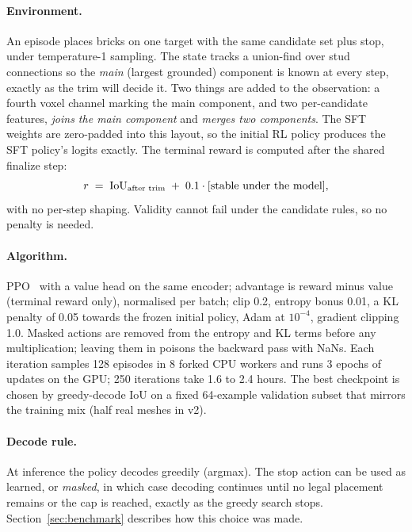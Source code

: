 \paragraph{Environment.} An episode places bricks on one target with the same candidate set plus stop, under
temperature-1 sampling. The state tracks a union-find over stud connections so the \emph{main} (largest grounded)
component is known at every step, exactly as the trim will decide it. Two things are added to the observation: a
fourth voxel channel marking the main component, and two per-candidate features, \emph{joins the main component} and
\emph{merges two components}. The SFT weights are zero-padded into this layout, so the initial RL policy produces the
SFT policy's logits exactly. The terminal reward is computed after the shared finalize step:
\[
  r \;=\; \mathrm{IoU}_{\text{after trim}} \;+\; 0.1\cdot[\text{stable under the model}],
\]
with no per-step shaping. Validity cannot fail under the candidate rules, so no penalty is needed.

\paragraph{Algorithm.} PPO~\citep{schulman2017ppo} with a value head on the same encoder; advantage is reward minus
value (terminal reward only), normalised per batch; clip 0.2, entropy bonus 0.01, a KL penalty of 0.05 towards the
frozen initial policy, Adam at $10^{-4}$, gradient clipping 1.0. Masked actions are removed from the entropy and KL
terms before any multiplication; leaving them in poisons the backward pass with NaNs. Each iteration samples 128
episodes in 8 forked CPU workers and runs 3 epochs of updates on the GPU; 250 iterations take 1.6 to 2.4 hours. The
best checkpoint is chosen by greedy-decode IoU on a fixed 64-example validation subset that mirrors the training mix
(half real meshes in v2).

\paragraph{Decode rule.} At inference the policy decodes greedily (argmax). The stop action can be used as learned,
or \emph{masked}, in which case decoding continues until no legal placement remains or the cap is reached, exactly as
the greedy search stops. Section~\ref{sec:benchmark} describes how this choice was made.
